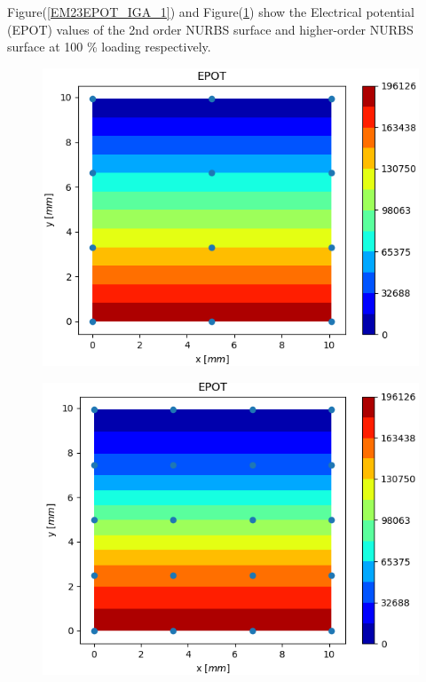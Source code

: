 \documentclass[11pt]{article}
\begin{document}
Figure(\ref{EM23EPOT_IGA_1}) and Figure(\ref{HEM12EPOT_IGA}) show the Electrical potential (EPOT) values of the 2nd order NURBS surface and higher-order NURBS surface at 100 \% loading respectively. \\
\begin{figure}[H]
	\centering
	\begin{minipage}{.5\textwidth}
		\centering
		\includegraphics[width=1\linewidth]{EM23EPOT_IGA.png}
		\label{EM23EPOT_IGA_1}
	\end{minipage}%
	\begin{minipage}{.5\textwidth}
		\centering
		\includegraphics[width=1\linewidth]{HEM12EPOT_IGA.png}
		\label{HEM12EPOT_IGA}
	\end{minipage}
\end{figure}
\end{document}
